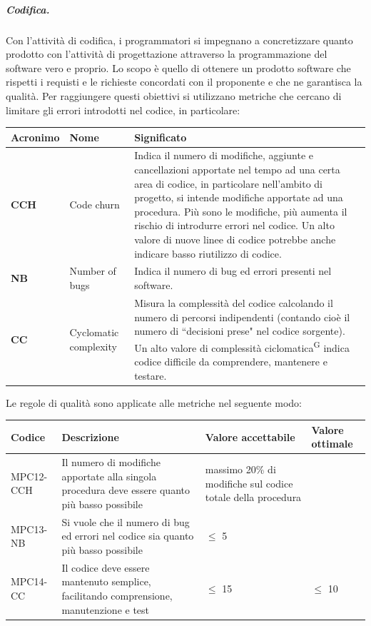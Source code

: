 \subparagraph{Codifica.}
Con l'attività di codifica, i programmatori si impegnano a concretizzare quanto prodotto con l'attività di progettazione attraverso la programmazione del software vero e proprio.
Lo scopo è quello di ottenere un prodotto software che rispetti i requisti e le richieste concordati con il proponente e che ne garantisca la qualità. Per raggiungere questi obiettivi si utilizzano metriche che cercano di limitare gli errori introdotti nel codice, in particolare:
\begin{table}[h!]
\centering
\def\arraystretch{1.5}
\begin{tabular}{ |m{2cm}|m{2.5cm}|m{9.5cm}| }
\hline
\rowcolor{lightgray!30}
\textbf{Acronimo} & \textbf{Nome} & \textbf{Significato}\\
\hline
\textbf{CCH} & Code churn & Indica il numero di modifiche, aggiunte e cancellazioni apportate nel tempo ad una certa area di codice, in particolare nell'ambito di progetto, si intende modifiche apportate ad una procedura. Più sono le modifiche, più aumenta il rischio di introdurre errori nel codice. Un alto valore di nuove linee di codice potrebbe anche indicare basso riutilizzo di codice.\\
\hline
\textbf{NB} & Number of bugs & Indica il numero di bug ed errori presenti nel software.\\
\hline
\textbf{CC} & Cyclomatic complexity & Misura la complessità del codice calcolando il numero di percorsi indipendenti (contando cioè il numero di ``decisioni prese" nel codice sorgente). Un alto valore di complessità ciclomatica\textsuperscript{G} indica codice difficile da comprendere, mantenere e testare.\\
\hline
\end{tabular}
\end{table}
\par Le regole di qualità sono applicate alle metriche nel seguente modo:
\begin{table}[h!]
\centering
\def\arraystretch{1.5}
\begin{tabular}{ |>{\centering\arraybackslash}m{2.5cm}|>{\centering\arraybackslash}m{5.5cm}|>{\centering\arraybackslash}m{3cm}|>{\centering\arraybackslash}m{3cm}| }
\hline
\rowcolor{black}
\textbf{\color{white} Codice} & \textbf{\color{white} Descrizione} & \textbf{\color{white} Valore accettabile} & \textbf{\color{white} Valore ottimale}\\
\hline
MPC12-CCH & Il numero di modifiche apportate alla singola procedura deve essere quanto più basso possibile & massimo 20\% di modifiche sul codice totale della procedura & 0 \\
\hline
MPC13-NB & Si vuole che il numero di bug ed errori nel codice sia quanto più basso possibile & $\leq$ 5 & 0 \\
\hline
MPC14-CC & Il codice deve essere mantenuto semplice, facilitando comprensione, manutenzione e test & $\leq$ 15 & $\leq$ 10 \\
\hline
\end{tabular}
\end{table}

